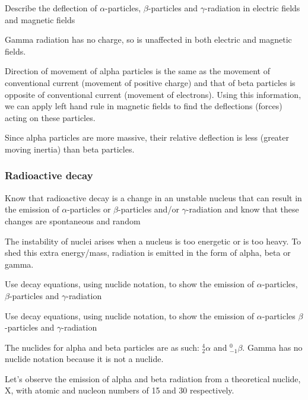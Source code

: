 \begin{subpoint}
Describe the deflection of $\alpha$-particles, $\beta$-particles and $\gamma$-radiation in electric fields and magnetic fields
\end{subpoint}

Gamma radiation has no charge, so is unaffected in both electric and magnetic fields.

Direction of movement of alpha particles is the same as the movement of conventional
current (movement of positive charge) and that of beta particles is opposite of 
conventional current (movement of electrons). Using this information, we can apply
left hand rule in magnetic fields to find the deflections (forces) acting on these
particles.

Since alpha particles are more massive, their relative deflection is less (greater
moving inertia) than beta particles.

\subsubsection{Radioactive decay}
\begin{subpoint}
Know that radioactive decay is a change in an unstable nucleus that can result in the
emission of $\alpha$-particles or $\beta$-particles and/or $\gamma$-radiation and know
that these changes are spontaneous and random
\end{subpoint}

The instability of nuclei arises when a nucleus is too energetic or is too heavy. To
shed this extra energy/mass, radiation is emitted in the form of alpha, beta or gamma.

\begin{subpoint}
Use decay equations, using nuclide notation, to show the emission of 
$\alpha$-particles, $\beta$-particles and $\gamma$-radiation
\end{subpoint}

\begin{subpoint}
Use decay equations, using nuclide notation, to show the emission of 
$\alpha$-particles $\beta$-particles and $\gamma$-radiation
\end{subpoint}

The nuclides for alpha and beta particles are as such: $^4_2\alpha$ and $^0_{-1}\beta$.
Gamma has no nuclide notation because it is not a nuclide.

Let's observe the emission of alpha and beta radiation from a theoretical nuclide, X, 
with atomic and nucleon numbers of 15 and 30 respectively.

